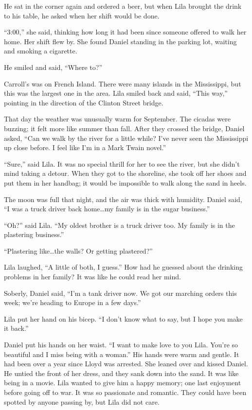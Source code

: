 \documentclass[
  letterpaper,
]{book}
\begin{document}
He sat in the corner again and ordered a beer, but when Lila brought the
drink to his table, he asked when her shift would be done.

``3:00,'' she said, thinking how long it had been since someone offered
to walk her home. Her shift flew by. She found Daniel standing in the
parking lot, waiting and smoking a cigarette.

He smiled and said, ``Where to?''

Carroll's was on French Island. There were many islands in the
Mississippi, but this was the largest one in the area. Lila smiled back
and said, ``This way,'' pointing in the direction of the Clinton Street
bridge.

That day the weather was unusually warm for September. The cicadas were
buzzing; it felt more like summer than fall. After they crossed the
bridge, Daniel asked, ``Can we walk by the river for a little while?
I've never seen the Mississippi up close before. I feel like I'm in a
Mark Twain novel.''

``Sure,'' said Lila. It was no special thrill for her to see the river,
but she didn't mind taking a detour. When they got to the shoreline, she
took off her shoes and put them in her handbag; it would be impossible
to walk along the sand in heels.

The moon was full that night, and the air was thick with humidity.
Daniel said, ``I was a truck driver back home\ldots my family is in the
sugar business.''

``Oh?'' said Lila. ``My oldest brother is a truck driver too. My family
is in the plastering business.''

``Plastering like\ldots the walls? Or getting plastered?''

Lila laughed, ``A little of both, I guess.'' How had he guessed about
the drinking problems in her family? It was like he could read her mind.

Soberly, Daniel said, ``I'm a tank driver now. We got our marching
orders this week; we're heading to Europe in a few days.''

Lila put her hand on his bicep. ``I don't know what to say, but I hope
you make it back.''

Daniel put his hands on her waist. ``I want to make love to you Lila.
You're so beautiful and I miss being with a woman.'' His hands were warm
and gentle. It had been over a year since Lloyd was arrested. She leaned
over and kissed Daniel. He untied the front of her dress, and they sank
down into the sand. It was like being in a movie. Lila wanted to give
him a happy memory; one last enjoyment before going off to war. It was
so passionate and romantic. They could have been spotted by anyone
passing by, but Lila did not care.
\end{document}

